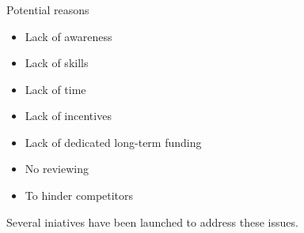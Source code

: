 \documentclass{beamer}
\begin{document}
\begin{frame}
  \frametitle{}
  \begin{block}{}
    \begin{center}
      Potential reasons\\
      \begin{itemize}
      \item Lack of awareness
      \item Lack of skills
      \item Lack of time
      \item Lack of incentives
      \item Lack of dedicated long-term funding
      \item No reviewing
      \item To hinder competitors
    \end{itemize}      
      \end{center}
  \end{block}
\end{frame}

\begin{frame}
  \begin{block}{}
    \begin{center}
      Several iniatives have been launched to address these issues.
    \end{center}
  \end{block}
\end{frame}
\end{document}
